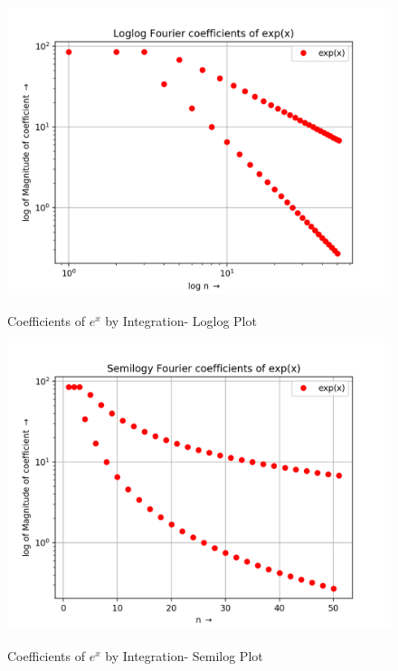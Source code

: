 \documentclass[11pt, a4paper]{article}
\begin{document}
\begin{figure}[H]
   	\centering
   	\includegraphics[scale=0.5]{loglog1t.png}
   	\label{fig:loglog1t}
   	\caption{Coefficients of $e^{x}$ by Integration- Loglog Plot}
\end{figure}
\begin{figure}[H]
   	\centering
   	\includegraphics[scale=0.5]{semilog1t.png}
   	\label{figsemilog1t}
   	\caption{Coefficients of $e^{x}$ by Integration- Semilog Plot}
\end{figure}
   
\end{document}
